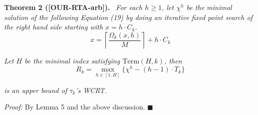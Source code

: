 \textbf{Theorem 2 ([OUR-RTA-arb]).} \ \textit{For each $h\geq 1$, let $\chi^h$ be the minimal solution of the following Equation (19) by doing an iterative fixed point search of the right hand side starting with $x=h\cdot C_k$.}
\[
x=\left\lceil \frac{\Omega_k(x,h)}{M} \right\rceil + h\cdot C_k
\tag{19}
\]

\textit{Let $H$ be the minimal index satisfying $\mathrm{Term}(H,k)$, then}
\[
R_k=\max_{h\in[1,H]}\{\chi^h-(h-1)\cdot T_k\}
\]

\textit{is an upper bound of $\tau_k$'s WCRT.}

\bigskip

\noindent
\textit{Proof:} By Lemma 5 and the above discussion. \hfill $\blacksquare$